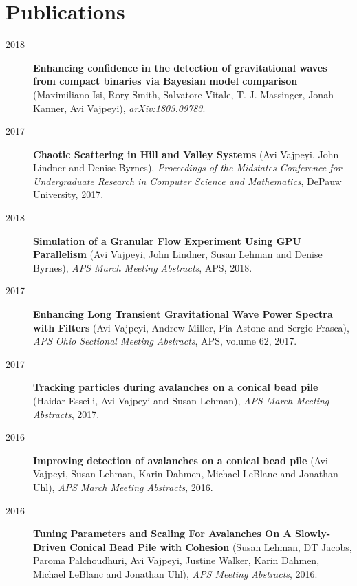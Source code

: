 \documentclass[]{friggeri-cv}
\begin{document}
\section{Publications}
\begin{description}
\item[2018]{\bf Enhancing confidence in the detection of gravitational waves from compact binaries via Bayesian model comparison} (Maximiliano Isi, Rory Smith, Salvatore Vitale, T. J. Massinger, Jonah Kanner, Avi Vajpeyi), {\em arXiv:1803.09783}.
\end{description}
\begin{description}
\item[2017]{\bf Chaotic Scattering in Hill and Valley Systems} (Avi Vajpeyi, John Lindner and Denise Byrnes), {\em Proceedings of the Midstates Conference for Undergraduate Research in Computer Science and Mathematics}, DePauw University, 2017.
\end{description}%
\begin{description}
\item[2018]{\bf Simulation of a Granular Flow Experiment Using GPU Parallelism} (Avi Vajpeyi, John Lindner, Susan Lehman and Denise Byrnes), {\em APS March Meeting Abstracts}, APS, 2018.
\item[2017]{\bf Enhancing Long Transient Gravitational Wave Power Spectra with Filters} (Avi Vajpeyi, Andrew Miller, Pia Astone and Sergio Frasca), {\em APS Ohio Sectional Meeting Abstracts}, APS, volume 62, 2017.
\item[2017]{\bf Tracking particles during avalanches on a conical bead pile} (Haidar Esseili, Avi Vajpeyi and Susan Lehman), {\em APS March Meeting Abstracts}, 2017.
\item[2016]{\bf Improving detection of avalanches on a conical bead pile} (Avi Vajpeyi, Susan Lehman, Karin Dahmen, Michael LeBlanc and Jonathan Uhl), {\em APS March Meeting Abstracts}, 2016.
\item[2016]{\bf Tuning Parameters and Scaling For Avalanches On A Slowly-Driven Conical Bead Pile with Cohesion} (Susan Lehman, DT Jacobs, Paroma Palchoudhuri, Avi Vajpeyi, Justine Walker, Karin Dahmen, Michael LeBlanc and Jonathan Uhl), {\em APS Meeting Abstracts}, 2016.\\
\end{description}
\end{document}
